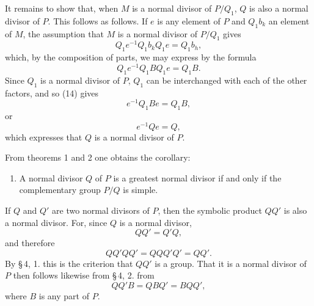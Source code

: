 \documentclass[11pt]{article}
\begin{document}
It remains to show that, when $M$ is a normal divisor of $P/Q_1$, $Q$ is also a normal divisor of $P$. This follows as follows. If $e$ is any element of $P$ and $Q_1b_k$ an element of $M$, the assumption that $M$ is a normal divisor of $P/Q_1$ gives
\[
Q_1e^{-1}Q_1b_kQ_1e=Q_1b_h,
\]
which, by the composition of parts, we may express by the formula
\begin{equation}
Q_1e^{-1}Q_1BQ_1e=Q_1B.
\tag{14}
\end{equation}
Since $Q_1$ is a normal divisor of $P$, $Q_1$ can be interchanged with each of the other factors, and so (14) gives
\[
e^{-1}Q_1Be=Q_1B,
\]
or
\begin{equation}
e^{-1}Qe=Q,
\tag{15}
\end{equation}
which expresses that $Q$ is a normal divisor of $P$.

From theorems 1 and 2 one obtains the corollary:
\begin{enumerate}[resume,label=\arabic*.]
\item A normal divisor $Q$ of $P$ is a greatest normal divisor if and only if the complementary group $P/Q$ is simple.
\end{enumerate}

If $Q$ and $Q'$ are two normal divisors of $P$, then the symbolic product $QQ'$ is also a normal divisor. For, since $Q$ is a normal divisor,
\[
QQ'=Q'Q,
\]
and therefore
\[
QQ'QQ'=QQQ'Q'=QQ'.
\]
By \S\,4, 1. this is the criterion that $QQ'$ is a group. That it is a normal divisor of $P$ then follows likewise from \S\,4, 2. from
\[
QQ'B=QBQ'=BQQ',
\]
where $B$ is any part of $P$.
\end{document}
